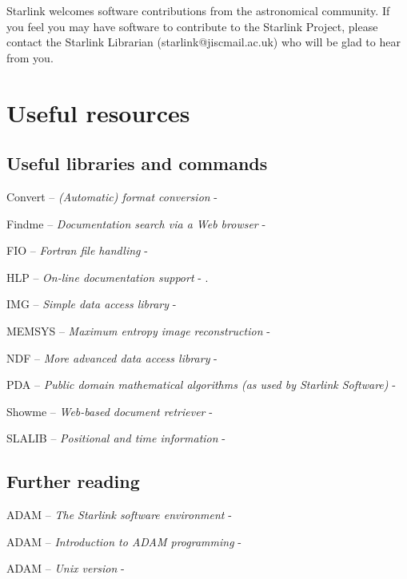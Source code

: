 Starlink welcomes software contributions from the astronomical community.
If you feel you may have software to contribute to the Starlink Project,
please contact the Starlink Librarian ({\sf starlink@jiscmail.ac.uk}) who
will be glad to hear from you.

\newpage

\appendix

\section{Useful resources}

\subsection{Useful libraries and commands}

Convert -- {\em (Automatic) format conversion} - 

Findme -- {\em Documentation search via a Web browser} -

FIO -- {\em Fortran file handling} - 

HLP -- {\em On-line documentation support} - .

IMG -- {\em Simple data access library} - 

MEMSYS -- {\em Maximum entropy image reconstruction} -

NDF -- {\em More advanced data access library} - 

PDA -- {\em Public domain mathematical algorithms (as used by Starlink
Software)} - 

Showme -- {\em Web-based document retriever} - 

SLALIB -- {\em Positional and time information} - 

\subsection{Further reading}

ADAM -- {\em The Starlink software environment} - 

ADAM -- {\em Introduction to ADAM programming} - 

ADAM -- {\em Unix version} - 

